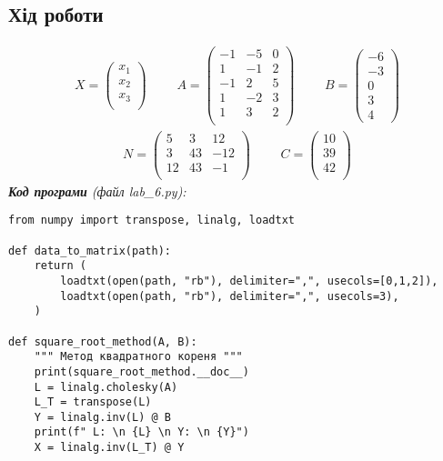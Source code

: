 \documentclass{article}
\newcommand\lab{6}
\begin{document}
\begin{large}
		\section*{Хід роботи}
		\begin{gather}\nonumber
			X=\begin{pmatrix}
				x_1\\
				x_2\\
				x_3\\
			\end{pmatrix}
			\hspace{28pt}
			A=\begin{pmatrix}
				-1 & -5 & 0\\
				1 & -1 & 2\\
				-1 & 2 & 5\\
				1 & -2 & 3\\
				1 & 3 & 2\\	
			\end{pmatrix}
			\hspace{28pt}
			B=\begin{pmatrix}
				-6\\
				-3\\
				0\\
				3\\
				4
			\end{pmatrix}
		\end{gather}
		\begin{gather}\nonumber
			N = \begin{pmatrix}
				5 & 3 &12\\
				3 & 43 & -12\\
				12 & 43 & -1\\
			\end{pmatrix}
			\hspace{28pt}
			C = \begin{pmatrix}
				10\\
				39\\
				42\\
			\end{pmatrix}
		\end{gather}
		\noindent\textit{\textbf{Код програми} (файл lab\_\lab.py):}
		\begin{lstlisting}
from numpy import transpose, linalg, loadtxt

def data_to_matrix(path):
	return (
		loadtxt(open(path, "rb"), delimiter=",", usecols=[0,1,2]),
		loadtxt(open(path, "rb"), delimiter=",", usecols=3),
	)

def square_root_method(A, B):
	""" Метод квадратного кореня """
	print(square_root_method.__doc__)
	L = linalg.cholesky(A)
	L_T = transpose(L)
	Y = linalg.inv(L) @ B
	print(f" L: \n {L} \n Y: \n {Y}")
	X = linalg.inv(L_T) @ Y


\end{lstlisting}
\end{large}
\end{document}
